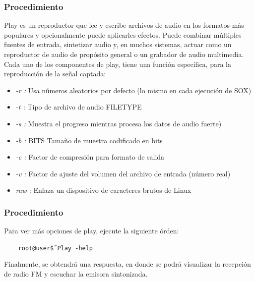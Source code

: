 \begin{frame}
\frametitle{Procedimiento}

Play es un reproductor que lee y escribe archivos de audio en los formatos más populares y opcionalmente puede aplicarles efectos. Puede combinar múltiples fuentes de entrada, sintetizar audio y, en muchos sistemas, actuar como un reproductor de audio de propósito general o un grabador de audio multimedia. \\
\vspace{2mm }
Cada uno de los componentes de play, tiene una función específica, para la reproducción de la señal captada:

\begin{itemize}
    \item {\textit{-r : } Usa números aleatorios por defecto (lo mismo en cada ejecución de SOX)}
    \item {\textit{-t : } Tipo de archivo de audio FILETYPE}
    \item {\textit{-s : } Muestra el progreso mientras procesa los datos de audio fuerte)}
    \item {\textit{-b : } BITS Tamaño de muestra codificado en bits}
    \item {\textit{-c : } Factor de compresión para formato de salida}
    \item {\textit{-v : } Factor de ajuste del volumen del archivo de entrada (número real)}
    \item {\textit{raw : } Enlaza un dispositivo de caracteres brutos de Linux}
\end{itemize}


\end{frame}

\begin{frame}
\frametitle{Procedimiento}

Para ver más opciones de play, ejecute la siguiente órden:

\begin{block}{}
  \texttt{
  \ \ \ root@user\~\$ Play {-}help}
\end{block} 

Finalmente, se obtendrá una respuesta, en donde se podrá visualizar la recepción de radio FM y escuchar la emisora sintonizada.

\end{frame}

